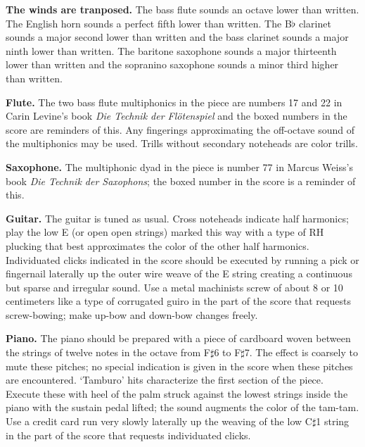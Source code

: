 \documentclass[10pt]{article}
\begin{document}
\begin{textblock}{23}
\textbf{The winds are tranposed.} The bass flute sounds an octave lower than
written. The English horn sounds a perfect fifth lower than written. The
B$\flat$ clarinet sounds a major second lower than written and the bass
clarinet sounds a major ninth lower than written. The baritone saxophone sounds
a major thirteenth lower than written and the sopranino saxophone sounds a
minor third higher than written.

\textbf{Flute.} The two bass flute multiphonics in the piece are numbers 17 and
22 in Carin Levine's book \textit{Die Technik der Flötenspiel} and the boxed
numbers in the score are reminders of this. Any fingerings approximating the
off-octave sound of the multiphonics may be used. Trills without secondary
noteheads are color trills.

\textbf{Saxophone.} The multiphonic dyad in the piece is number 77 in Marcus
Weiss's book \textit{Die Technik der Saxophons}; the boxed number in the score
is a reminder of this.

\textbf{Guitar.} The guitar is tuned as usual. Cross noteheads indicate half
harmonics; play the low E (or open open strings) marked this way with a type of
RH plucking that best approximates the color of the other half harmonics.
Individuated clicks indicated in the score should be executed by running a pick
or fingernail laterally up the outer wire weave of the E string creating a
continuous but sparse and irregular sound. Use a metal machinists screw of
about 8 or 10 centimeters like a type of corrugated guiro in the part of the
score that requests screw-bowing; make up-bow and down-bow changes freely.

\textbf{Piano.} The piano should be prepared with a piece of cardboard woven
between the strings of twelve notes in the octave from F$\sharp$6 to
F$\sharp$7. The effect is coarsely to mute these pitches; no special indication
is given in the score when these pitches are encountered. `Tamburo' hits
characterize the first section of the piece. Execute these with heel of the
palm struck against the lowest strings inside the piano with the sustain pedal
lifted; the sound augments the color of the tam-tam. Use a credit card run very
slowly laterally up the weaving of the low C$\sharp$1 string in the part of the
score that requests individuated clicks.


\end{textblock}
\end{document}
